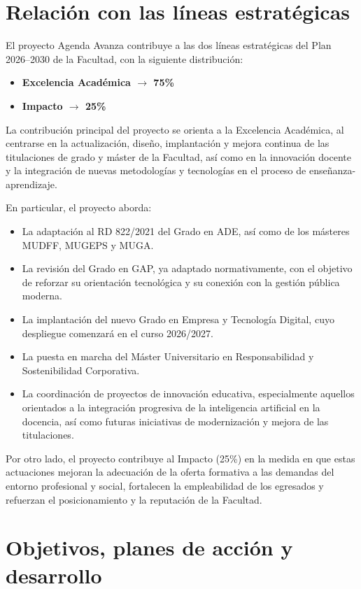\documentclass[11pt,a4paper]{scrreprt}
\begin{document}
\section{Relación con las líneas estratégicas}

\small
El proyecto Agenda Avanza contribuye a las dos líneas estratégicas del Plan 2026--2030 de la Facultad, con la siguiente distribución:

\begin{itemize}[noitemsep,topsep=2pt]
\item \textbf{Excelencia Académica $\rightarrow$ 75\%}
\item \textbf{Impacto $\rightarrow$ 25\%}
\end{itemize}
La contribución principal del proyecto se orienta a la Excelencia Académica, al centrarse en la actualización, diseño, implantación y mejora continua de las titulaciones de grado y máster de la Facultad, así como en la innovación docente y la integración de nuevas metodologías y tecnologías en el proceso de enseñanza-aprendizaje.

En particular, el proyecto aborda:
\begin{itemize}[noitemsep,topsep=2pt]
\item La adaptación al RD 822/2021 del Grado en ADE, así como de los másteres MUDFF, MUGEPS y MUGA.
\item La revisión del Grado en GAP, ya adaptado normativamente, con el objetivo de reforzar su orientación tecnológica y su conexión con la gestión pública moderna.
\item La implantación del nuevo Grado en Empresa y Tecnología Digital, cuyo despliegue comenzará en el curso 2026/2027.
\item La puesta en marcha del Máster Universitario en Responsabilidad y Sostenibilidad Corporativa.
\item La coordinación de proyectos de innovación educativa, especialmente aquellos orientados a la integración progresiva de la inteligencia artificial en la docencia, así como futuras iniciativas de modernización y mejora de las titulaciones.
\end{itemize}

Por otro lado, el proyecto contribuye al Impacto (25\%) en la medida en que estas actuaciones mejoran la adecuación de la oferta formativa a las demandas del entorno profesional y social, fortalecen la empleabilidad de los egresados y refuerzan el posicionamiento y la reputación de la Facultad.

\section{Objetivos, planes de acción y desarrollo}
\end{document}
